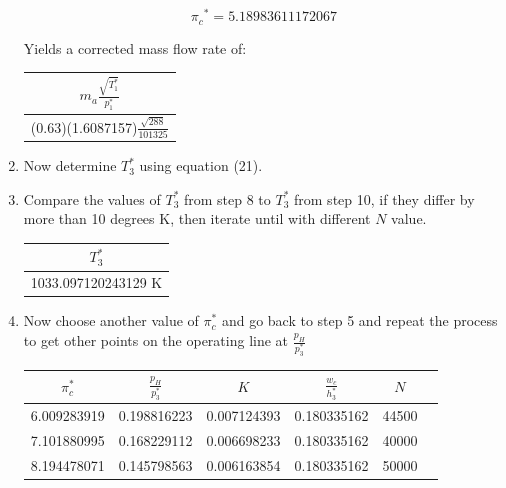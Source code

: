 \documentclass[titlepage]{article}
\begin{document}
\begin{enumerate}
  \begin{equation}
    \pi{_c}^{*} = 5.18983611172067
  \end{equation}

  Yields a corrected mass flow rate of:

  \begin{center}
    \begin{tabular}{|c|}
      \hline
      $m_{a}\frac{\sqrt{T_{1}^{*}}}{p_{1}^{*}}$ \\
      \hline
      (0.63)(1.6087157)$\frac{\sqrt{288}}{101325}$ \\
      \hline
    \end{tabular}
  \end{center}

  \item Now determine $T_{3}^{*}$ using equation (21).
  \item Compare the values of $T_{3}^{*}$ from step 8 to $T_{3}^{*}$ from step 10, if they differ by more than 10 degrees K, then iterate until with different $N$ value.
  
  \begin{center}
    \begin{tabular}{|c|}
      \hline
      $T_{3}^{*}$ \\
      \hline
      1033.097120243129 K \\
      \hline
    \end{tabular}
  \end{center}

\item Now choose another value of $\pi_{c}^{*}$ and go back to step 5 and repeat the process to get other points on the operating line at $\frac{p_{H}}{p_{3}^{*}}$ 

\begin{center}
  \begin{tabular}{|c|c|c|c|c|c|}
    \hline
    $\pi_{c}^{*}$ & $\frac{p_{H}}{p_{3}^{*}}$ & $K$ & $\frac{w_{c}}{h_{3}^{*}}$ & $N$ \\
    \hline
    6.009283919	& 0.198816223	& 0.007124393 &	0.180335162	& 44500 \\
    \hline
    7.101880995	& 0.168229112 &	0.006698233 &	0.180335162	& 40000 \\
    \hline
    8.194478071 &	0.145798563 &	0.006163854	& 0.180335162	& 50000 \\
    \hline
  \end{tabular}
\end{center}


\end{enumerate}
\end{document}
